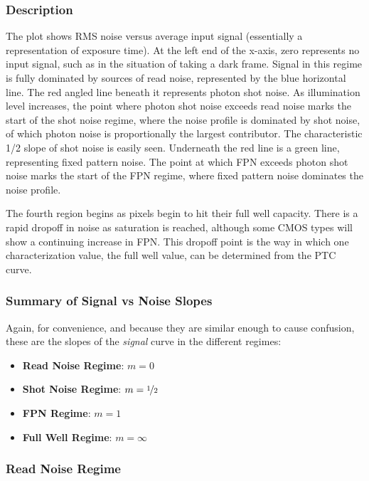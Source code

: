 \documentclass[10pt]{article}
\begin{document}
\subsubsection{Description}

The plot shows RMS noise versus average input signal (essentially a representation of exposure time). At the left end of the x-axis, zero represents no input signal, such as in the situation of taking a dark frame. Signal in this regime is fully dominated by sources of read noise, represented by the blue horizontal line. The red angled line beneath it represents photon shot noise. As illumination level increases, the point where photon shot noise exceeds read noise marks the start of the shot noise regime, where the noise profile is dominated by shot noise, of which photon noise is proportionally the largest contributor. The characteristic 1/2 slope of shot noise is easily seen. Underneath the red line is a green line, representing fixed pattern noise. The point at which FPN exceeds photon shot noise marks the start of the FPN regime, where fixed pattern noise dominates the noise profile. 

The fourth region begins as pixels begin to hit their full well capacity. There is a rapid dropoff in noise as saturation is reached, although some CMOS types will show a continuing increase in FPN. This dropoff point is the way in which one characterization value, the full well value, can be determined from the PTC curve.

\subsubsection{Summary of Signal vs Noise Slopes}

Again, for convenience, and because they are similar enough to cause confusion, these are the slopes of the \emph{signal} curve in the different regimes:

\begin{itemize}[noitemsep]
    \item \textbf{Read Noise Regime}: $m=0$
    \item \textbf{Shot Noise Regime}: $m=\nicefrac{1}{2}$
    \item \textbf{FPN Regime}: $m=1$
    \item \textbf{Full Well Regime}: $m=\infty$
\end{itemize}

\subsubsection{Read Noise Regime}
\end{document}
